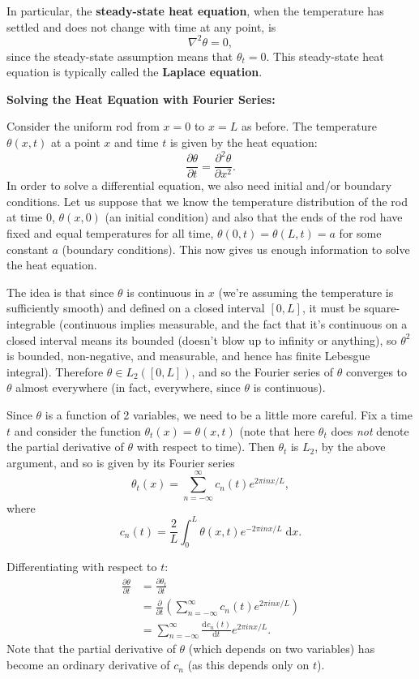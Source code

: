 \documentclass{article}
\newcommand{\deriv}[3][]{\frac{\mathrm{d}^{#1}#2}{\mathrm{d}#3^{#1}}}
\newcommand{\diff}{\;\mathrm{d}}
\begin{document}
In particular, the \textbf{steady-state heat equation}, when the temperature has settled and does not change with time at any point, is
\[\nabla^2\theta=0,\]
since the steady-state assumption means that $\theta_t=0$. This steady-state heat equation is typically called the \textbf{Laplace equation}.



\clearpage






\textbf{Solving the Heat Equation with Fourier Series:}\bigskip

Consider the uniform rod from $x=0$ to $x=L$ as before. The temperature $\theta(x,t)$ at a point $x$ and time $t$ is given by the heat equation:
\[\frac{\partial \theta}{\partial t}=\frac{\partial^2 \theta}{\partial x^2}.\]
In order to solve a differential equation, we also need initial and/or boundary conditions. Let us suppose that we know the temperature distribution of the rod at time $0$, $\theta(x,0)$ (an initial condition) and also that the ends of the rod have fixed and equal temperatures for all time, $\theta(0,t)=\theta(L,t)=a$ for some constant $a$ (boundary conditions). This now gives us enough information to solve the heat equation.

The idea is that since $\theta$ is continuous in $x$ (we're assuming the temperature is sufficiently smooth) and defined on a closed interval $[0,L]$, it must be square-integrable (continuous implies measurable, and the fact that it's continuous on a closed interval means its bounded (doesn't blow up to infinity or anything), so $\theta^2$ is bounded, non-negative, and measurable, and hence has finite Lebesgue integral). Therefore $\theta\in L_2([0,L])$, and so the Fourier series of $\theta$ converges to $\theta$ almost everywhere (in fact, everywhere, since $\theta$ is continuous).

Since $\theta$ is a function of 2 variables, we need to be a little more careful. Fix a time $t$ and consider the function $\theta_t(x)=\theta(x,t)$ (note that here $\theta_t$ does \textit{not} denote the partial derivative of $\theta$ with respect to time). Then $\theta_t$ is $L_2$, by the above argument, and so is given by its Fourier series
\[\theta_t(x)=\sum_{n=-\infty}^\infty c_{n}(t)e^{2\pi i nx/L},\]
where
\[c_n(t)=\frac{2}{L}\int_0^L \theta(x,t)e^{-2\pi i nx/L}\diff x.\]

Differentiating with respect to $t$:
\begin{align*}
	\frac{\partial \theta}{\partial t} &=\frac{\partial \theta_t}{\partial t}\\
	&=\frac{\partial }{\partial t}\left(\sum_{n=-\infty}^\infty c_n(t)e^{2\pi i nx/L}\right)\\
	&= \sum_{n=-\infty}^\infty \deriv{c_n(t)}{t}e^{2\pi inx/L}.
\end{align*}
Note that the partial derivative of $\theta$ (which depends on two variables) has become an ordinary derivative of $c_n$ (as this depends only on $t$).
\end{document}
